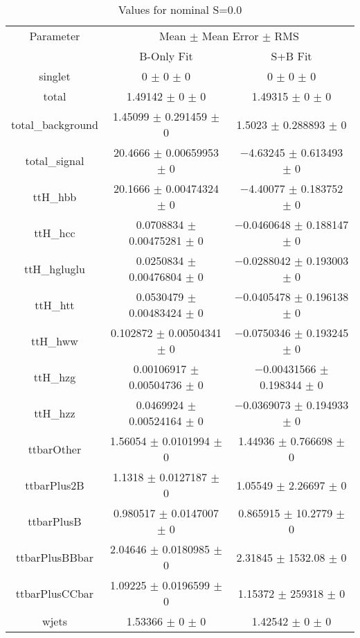 \begin{table}
\centering
\caption{Values for nominal S=0.0}
\begin{tabular}{ccc}
\toprule
Parameter & \multicolumn{2}{c}{Mean $\pm$ Mean Error $\pm$ RMS}\\
 & B-Only Fit & S+B Fit\\
\midrule
singlet & \num{0} $\pm$ \num{0} $\pm$ \num{0} & \num{0} $\pm$ \num{0} $\pm$ \num{0}\\
total & \num{1.49142} $\pm$ \num{0} $\pm$ \num{0} & \num{1.49315} $\pm$ \num{0} $\pm$ \num{0}\\
total\_background & \num{1.45099} $\pm$ \num{0.291459} $\pm$ \num{0} & \num{1.5023} $\pm$ \num{0.288893} $\pm$ \num{0}\\
total\_signal & \num{20.4666} $\pm$ \num{0.00659953} $\pm$ \num{0} & \num{-4.63245} $\pm$ \num{0.613493} $\pm$ \num{0}\\
ttH\_hbb & \num{20.1666} $\pm$ \num{0.00474324} $\pm$ \num{0} & \num{-4.40077} $\pm$ \num{0.183752} $\pm$ \num{0}\\
ttH\_hcc & \num{0.0708834} $\pm$ \num{0.00475281} $\pm$ \num{0} & \num{-0.0460648} $\pm$ \num{0.188147} $\pm$ \num{0}\\
ttH\_hgluglu & \num{0.0250834} $\pm$ \num{0.00476804} $\pm$ \num{0} & \num{-0.0288042} $\pm$ \num{0.193003} $\pm$ \num{0}\\
ttH\_htt & \num{0.0530479} $\pm$ \num{0.00483424} $\pm$ \num{0} & \num{-0.0405478} $\pm$ \num{0.196138} $\pm$ \num{0}\\
ttH\_hww & \num{0.102872} $\pm$ \num{0.00504341} $\pm$ \num{0} & \num{-0.0750346} $\pm$ \num{0.193245} $\pm$ \num{0}\\
ttH\_hzg & \num{0.00106917} $\pm$ \num{0.00504736} $\pm$ \num{0} & \num{-0.00431566} $\pm$ \num{0.198344} $\pm$ \num{0}\\
ttH\_hzz & \num{0.0469924} $\pm$ \num{0.00524164} $\pm$ \num{0} & \num{-0.0369073} $\pm$ \num{0.194933} $\pm$ \num{0}\\
ttbarOther & \num{1.56054} $\pm$ \num{0.0101994} $\pm$ \num{0} & \num{1.44936} $\pm$ \num{0.766698} $\pm$ \num{0}\\
ttbarPlus2B & \num{1.1318} $\pm$ \num{0.0127187} $\pm$ \num{0} & \num{1.05549} $\pm$ \num{2.26697} $\pm$ \num{0}\\
ttbarPlusB & \num{0.980517} $\pm$ \num{0.0147007} $\pm$ \num{0} & \num{0.865915} $\pm$ \num{10.2779} $\pm$ \num{0}\\
ttbarPlusBBbar & \num{2.04646} $\pm$ \num{0.0180985} $\pm$ \num{0} & \num{2.31845} $\pm$ \num{1532.08} $\pm$ \num{0}\\
ttbarPlusCCbar & \num{1.09225} $\pm$ \num{0.0196599} $\pm$ \num{0} & \num{1.15372} $\pm$ \num{259318} $\pm$ \num{0}\\
wjets & \num{1.53366} $\pm$ \num{0} $\pm$ \num{0} & \num{1.42542} $\pm$ \num{0} $\pm$ \num{0}\\
\bottomrule
\end{tabular}
\end{table}